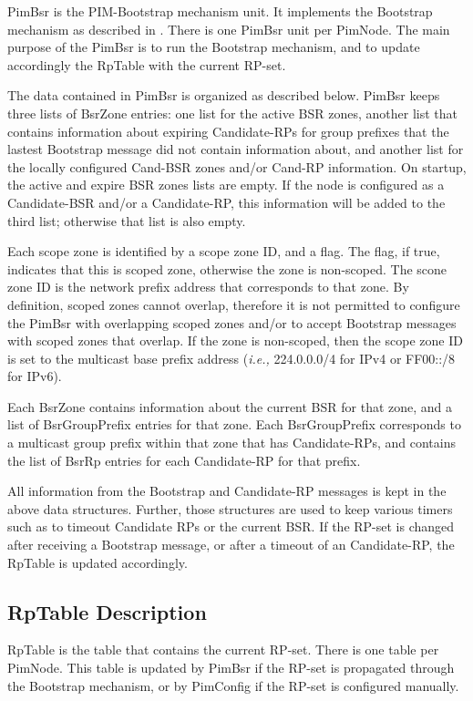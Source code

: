 \documentclass[11pt]{article}
\newcommand{\ie}{\emph{i.e.,}\xspace}
\begin{document}
PimBsr is the PIM-Bootstrap mechanism unit. It implements the Bootstrap
mechanism as described in \cite{PIM-SM-BOOTSTRAP}. There is one PimBsr
unit per PimNode. The main purpose of the PimBsr is to run the Bootstrap
mechanism, and to update accordingly the RpTable with the current RP-set.

The data contained in PimBsr is organized as described below.
PimBsr keeps three lists of BsrZone entries: one list for the active BSR
zones, another list that contains information about expiring Candidate-RPs for
group prefixes that the lastest Bootstrap message did not contain information
about, and another list for the locally configured Cand-BSR zones and/or
Cand-RP information. On startup, the active and expire BSR zones lists are
empty. If the node is configured as a Candidate-BSR and/or a Candidate-RP,
this information will be added to the third list; otherwise that list is 
also empty.

Each scope zone is identified by a scope zone ID, and a flag.
The flag, if true, indicates that this is scoped zone, otherwise the
zone is non-scoped. The scone zone ID is the network prefix address that
corresponds to that zone. By definition, scoped zones cannot overlap,
therefore it is not permitted to configure the PimBsr with overlapping
scoped zones and/or to accept Bootstrap messages with scoped zones that
overlap. If the zone is non-scoped, then the scope zone ID is set to the
multicast base prefix address (\ie 224.0.0.0/4 for IPv4 or FF00::/8 for
IPv6).

Each BsrZone contains information about the current BSR for that zone,
and a list of BsrGroupPrefix entries for that zone. Each BsrGroupPrefix
corresponds to a multicast group prefix within that zone that has
Candidate-RPs, and contains the list of BsrRp entries for each
Candidate-RP for that prefix.

All information from the Bootstrap and Candidate-RP messages is kept in
the above data structures. Further, those structures are used to keep
various timers such as to timeout Candidate RPs or the current BSR.
If the RP-set is changed after receiving a Bootstrap message, or after a
timeout of an Candidate-RP, the RpTable is updated accordingly.


\subsection{RpTable Description}

RpTable is the table that contains the current RP-set. There is one
table per PimNode. This table is updated by PimBsr if the RP-set is
propagated through the Bootstrap mechanism, or by PimConfig if the
RP-set is configured manually.
\end{document}
